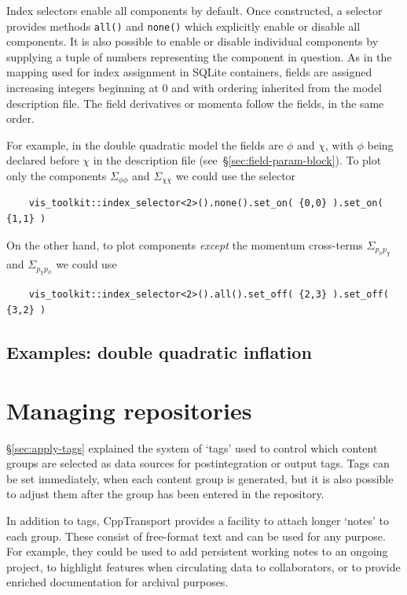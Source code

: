 \documentclass[11pt,a4paper]{article}
\newcommand{\packagefont}{\sffamily}
\newcommand{\CppTransport}{{\packagefont CppTransport}}
\newcommand{\SQLite}{{\packagefont SQLite}}
\begin{document}
Index selectors enable all components by default.
Once constructed, a selector provides methods
\texttt{all()}
and
\texttt{none()}
which explicitly enable or disable all components.
It is also possible to enable or disable individual
components by supplying a tuple of numbers representing
the component in question.
As in the mapping used for index assignment in {\SQLite} containers,
fields are assigned increasing integers beginning at 0
and with ordering inherited from the model description file.
The field derivatives or momenta
follow the fields, in the same order.

For example, in the double quadratic model the fields are
$\phi$ and $\chi$, with $\phi$ being declared before $\chi$
in the description file (see~\S\ref{sec:field-param-block}).
To plot only the components $\Sigma_{\phi\phi}$ and
$\Sigma_{\chi\chi}$ we could use the selector
\begin{verbatim}    
    vis_toolkit::index_selector<2>().none().set_on( {0,0} ).set_on( {1,1} )
\end{verbatim}
On the other hand, to plot components \emph{except} the
momentum cross-terms
$\Sigma_{p_\phi p_\chi}$
and
$\Sigma_{p_\chi p_\phi}$
we could use
\begin{verbatim}
    vis_toolkit::index_selector<2>().all().set_off( {2,3} ).set_off( {3,2} )    
\end{verbatim}

\subsection{Examples: double quadratic inflation}

\section{Managing repositories}
\label{sec:repo-management}

\S\ref{sec:apply-tags} explained the system of `tags' used to control which
content groups are selected as data sources
for postintegration or output tags.
Tags can be set immediately, when each content group is generated,
but it is also possible to adjust them after
the group has been entered in the repository.

In addition to tags, {\CppTransport} provides a facility to attach
longer `notes' to each group.
These consist of free-format text and can be used for any purpose.
For example, they could be used to add persistent working notes
to an ongoing project,
to highlight features when circulating data to collaborators,
or to provide enriched documentation for archival purposes.
\end{document}
